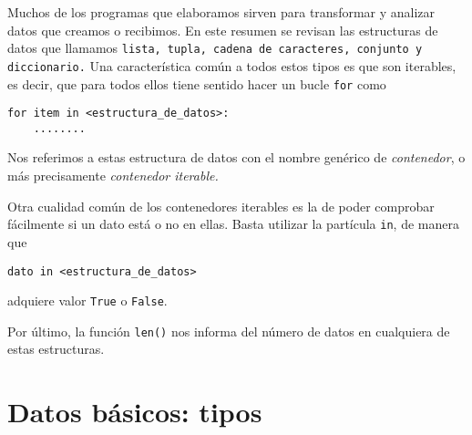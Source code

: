 
Muchos de los programas que elaboramos sirven para transformar y analizar
datos que creamos o recibimos. En este resumen se revisan  las
estructuras de
datos que llamamos {\tt lista, tupla, cadena de caracteres, conjunto y
diccionario.} Una
característica común a todos estos tipos es que son {\sc iterables,} es decir,
\label{iterable}
que para
todos ellos tiene
sentido hacer un bucle \lstinline|for|  como
\begin{lstlisting}[numbers=none]
for item in <estructura_de_datos>:
	........
\end{lstlisting}

Nos referimos a estas  estructura de datos con el nombre gen\'erico de
{\itshape contenedor}, o m\'as precisamente {\itshape contenedor iterable.}






Otra cualidad común de los contenedores iterables  es la de poder comprobar
f\'acilmente si un
dato está o
no en ellas. Basta utilizar la partícula \lstinline|in|, de manera que
\begin{lstlisting}
dato in <estructura_de_datos>
\end{lstlisting} 
adquiere valor \lstinline|True| o \lstinline|False|.

Por último, la función \lstinline|len()| nos informa del número de datos en
cualquiera de  estas estructuras. 


\section{Datos b\'asicos: tipos}

